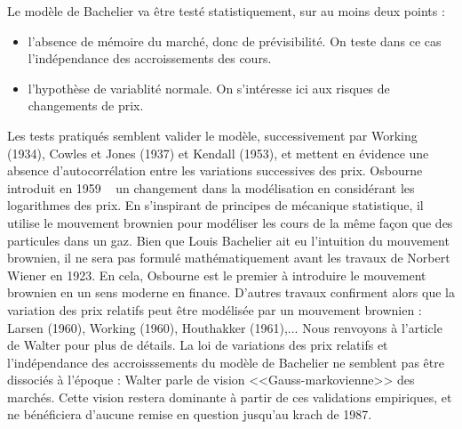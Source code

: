 \documentclass{article}
\begin{document}
Le modèle de Bachelier va être testé statistiquement, sur au moins deux points :
\begin{itemize}
\item l'absence de mémoire du marché, donc de prévisibilité. On teste dans ce cas l'indépendance des accroissements des cours.
\item l'hypothèse de variablité normale. On s'intéresse ici aux risques de changements de prix.\\
\end{itemize}

Les tests pratiqués semblent valider le modèle, successivement par Working (1934), Cowles et Jones (1937) et Kendall (1953), et mettent en évidence une absence d'autocorrélation entre les variations successives des prix. Osbourne introduit en 1959 ~\cite{Osbourne} un changement dans la modélisation en considérant les logarithmes des prix. En s'inspirant de principes de mécanique statistique, il utilise le mouvement brownien pour modéliser les cours de la même façon que des particules dans un gaz. Bien que Louis Bachelier ait eu l'intuition du mouvement brownien, il ne sera pas formulé mathématiquement avant les travaux de Norbert Wiener en 1923. En cela, Osbourne est le premier à introduire le mouvement brownien en un sens moderne en finance. D'autres travaux confirment alors que la variation des prix relatifs peut être modélisée par un mouvement brownien : Larsen (1960), Working (1960), Houthakker (1961),... Nous renvoyons à l'article de Walter pour plus de détails. La loi de variations des prix relatifs et l'indépendance des accroisssements du modèle de Bachelier ne semblent pas être dissociés à l'époque : Walter parle de vision <<Gauss-markovienne>> des marchés. Cette vision restera dominante à partir de ces validations empiriques, et ne bénéficiera d'aucune remise en question jusqu'au krach de 1987.\\
\end{document}
